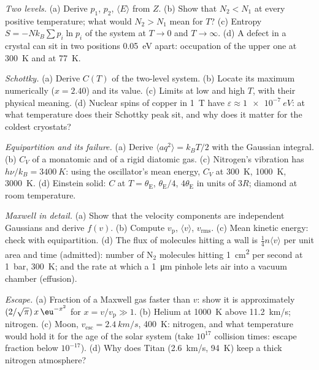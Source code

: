 \begin{exercise}[$\star\star$]\label{exo:b2:boltzmann-factor:5}
\emph{Two levels.} (a) Derive $p_1$, $p_2$, $\langle E\rangle$ from $Z$. (b)
Show that $N_2 < N_1$ at every positive temperature; what would $N_2 >
N_1$ mean for $T$? (c) Entropy $S = -Nk_B\sum p_i\ln p_i$ of the system at
$T \to 0$ and $T \to \infty$. (d) A defect in a crystal can sit in two
positions \qty{0.05}{eV} apart: occupation of the upper one at
\qty{300}{K} and at \qty{77}{K}.
\end{exercise}

\begin{exercise}[$\star\star$]\label{exo:b2:boltzmann-factor:6}
\emph{Schottky.} (a) Derive $C(T)$ of the two-level system. (b) Locate
its maximum numerically ($x = 2.40$) and its value. (c) Limits at low
and high $T$, with their physical meaning. (d) Nuclear spins of copper
in \qty{1}{T} have $\varepsilon \approx \qty{1e-7}{eV}$: at what temperature does
their Schottky peak sit, and why does it matter for the coldest
cryostats?
\end{exercise}

\begin{exercise}[$\star\star$]\label{exo:b2:boltzmann-factor:7}
\emph{Equipartition and its failure.} (a) Derive $\langle aq^2\rangle =
k_BT/2$ with the Gaussian integral. (b) $C_V$ of a monatomic and of a
rigid diatomic gas. (c) Nitrogen's vibration has $h\nu/k_B = \qty{3400}{K}$:
using the oscillator's mean energy, $C_V$ at \qty{300}{K}, \qty{1000}{K},
\qty{3000}{K}. (d) Einstein solid: $C$ at $T = \theta_{\text{E}}$, $\theta_{\text{E}}/4$,
$4\theta_{\text{E}}$ in units of $3R$; diamond at room temperature.
\end{exercise}

\begin{exercise}[$\star\star$]\label{exo:b2:boltzmann-factor:8}
\emph{Maxwell in detail.} (a) Show that the velocity components are
independent Gaussians and derive $f(v)$. (b) Compute $v_{\text{p}}$,
$\langle v\rangle$, $v_{\text{rms}}$. (c) Mean kinetic energy: check with
equipartition. (d) The flux of molecules hitting a wall is
$\tfrac14n\langle v\rangle$ per unit area and time (admitted): number of
N$_2$ molecules hitting \qty{1}{cm^2} per second at \qty{1}{bar},
\qty{300}{K}; and the rate at which a \qty{1}{\micro m} pinhole lets air
into a vacuum chamber (effusion).
\end{exercise}

\begin{exercise}[$\star\star$]\label{exo:b2:boltzmann-factor:9}
\emph{Escape.} (a) Fraction of a Maxwell gas faster than $v$: show it
is approximately $(2/\sqrt\pi)\,x\,\eu^{-x^2}$ for $x = v/v_{\text{p}} \gg 1$.
(b) Helium at \qty{1000}{K} above \qty{11.2}{km/s}; nitrogen. (c) Moon,
$v_{\text{esc}} = \qty{2.4}{km/s}$, \qty{400}{K}: nitrogen, and what
temperature would hold it for the age of the solar system (take $10^{17}$
collision times: escape fraction below $10^{-17}$). (d) Why does Titan
(\qty{2.6}{km/s}, \qty{94}{K}) keep a thick nitrogen atmosphere?
\end{exercise}

